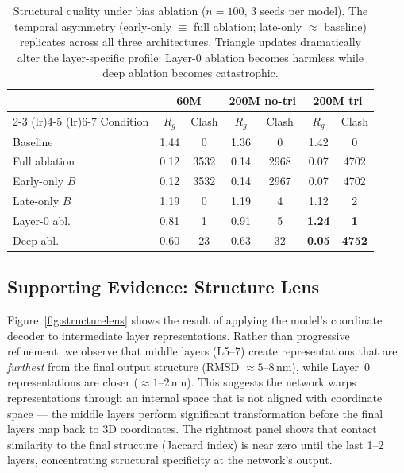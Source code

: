 \documentclass{article}
\begin{document}
\begin{table}[t]
    \centering
    \caption{Structural quality under bias ablation ($n{=}100$, 3 seeds per model). The temporal asymmetry (early-only $\equiv$ full ablation; late-only $\approx$ baseline) replicates across all three architectures. Triangle updates dramatically alter the layer-specific profile: Layer-0 ablation becomes harmless while deep ablation becomes catastrophic.}
    \label{tab:ablation}
    \begin{tabular}{lcccccc}
        \toprule
        & \multicolumn{2}{c}{\textbf{60M}} & \multicolumn{2}{c}{\textbf{200M no-tri}} & \multicolumn{2}{c}{\textbf{200M tri}} \\
        \cmidrule(lr){2-3} \cmidrule(lr){4-5} \cmidrule(lr){6-7}
        Condition & $R_g$ & Clash & $R_g$ & Clash & $R_g$ & Clash \\
        \midrule
        Baseline & 1.44 & 0 & 1.36 & 0 & 1.42 & 0 \\
        Full ablation & 0.12 & 3532 & 0.14 & 2968 & 0.07 & 4702 \\
        Early-only $B$ & 0.12 & 3532 & 0.14 & 2967 & 0.07 & 4702 \\
        Late-only $B$ & 1.19 & 0 & 1.19 & 4 & 1.12 & 2 \\
        Layer-0 abl. & 0.81 & 1 & 0.91 & 5 & \textbf{1.24} & \textbf{1} \\
        Deep abl. & 0.60 & 23 & 0.63 & 32 & \textbf{0.05} & \textbf{4752} \\
        \bottomrule
    \end{tabular}
\end{table}

\subsection{Supporting Evidence: Structure Lens}

Figure~\ref{fig:structurelens} shows the result of applying the model's coordinate decoder to intermediate layer representations.
Rather than progressive refinement, we observe that middle layers (L5--7) create representations that are \emph{furthest} from the final output structure (RMSD $\approx 5$--$8$\,nm), while Layer~0 representations are closer ($\approx 1$--$2$\,nm).
This suggests the network warps representations through an internal space that is not aligned with coordinate space --- the middle layers perform significant transformation before the final layers map back to 3D coordinates.
The rightmost panel shows that contact similarity to the final structure (Jaccard index) is near zero until the last 1--2 layers, concentrating structural specificity at the network's output.
\end{document}
